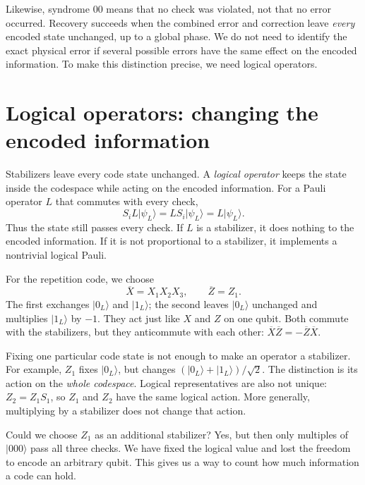 \documentclass[11pt,a4paper]{article}
\newcommand{\ket}[1]{\lvert #1\rangle}
\begin{document}
Likewise, syndrome \(00\) means that no check was violated, not that no error occurred. Recovery succeeds when the combined error and correction leave \emph{every} encoded state unchanged, up to a global phase. We do not need to identify the exact physical error if several possible errors have the same effect on the encoded information. To make this distinction precise, we need logical operators.

\section{Logical operators: changing the encoded information}
Stabilizers leave every code state unchanged. A \emph{logical operator} keeps the state inside the codespace while acting on the encoded information. For a Pauli operator \(L\) that commutes with every check,
\begin{equation}
S_iL\ket{\psi_L}=LS_i\ket{\psi_L}=L\ket{\psi_L}.
\end{equation}
Thus the state still passes every check. If \(L\) is a stabilizer, it does nothing to the encoded information. If it is not proportional to a stabilizer, it implements a nontrivial logical Pauli.

For the repetition code, we choose
\begin{equation}\label{eq:logical-paulis}
\overline X=X_1X_2X_3,\qquad \overline Z=Z_1.
\end{equation}
The first exchanges \(\ket{0_L}\) and \(\ket{1_L}\); the second leaves \(\ket{0_L}\) unchanged and multiplies \(\ket{1_L}\) by \(-1\). They act just like \(X\) and \(Z\) on one qubit. Both commute with the stabilizers, but they anticommute with each other: \(\overline X\overline Z=-\overline Z\overline X\).

Fixing one particular code state is not enough to make an operator a stabilizer. For example, \(Z_1\) fixes \(\ket{0_L}\), but changes \((\ket{0_L}+\ket{1_L})/\sqrt2\). The distinction is its action on the \emph{whole codespace}. Logical representatives are also not unique: \(Z_2=Z_1S_1\), so \(Z_1\) and \(Z_2\) have the same logical action. More generally, multiplying by a stabilizer does not change that action.

Could we choose \(Z_1\) as an additional stabilizer? Yes, but then only multiples of \(\ket{000}\) pass all three checks. We have fixed the logical value and lost the freedom to encode an arbitrary qubit. This gives us a way to count how much information a code can hold.
\end{document}
